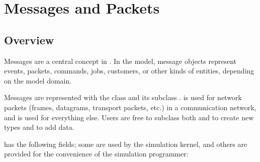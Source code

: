 \chapter{Messages and Packets}
\label{cha:messages}

\section{Overview}
\label{sec:msgs:overview}

Messages are a central concept in {\opp}. In the model, message objects
represent events, packets, commands, jobs, customers, or other kinds of
entities, depending on the model domain.

Messages are represented with the  class and its subclass
.  is used for network packets (frames,
datagrams, transport packets, etc.) in a communication network, and
 is used for everything else. Users are free to subclass
both  and  to create new types and to
add data.

 has the following fields; some are used by
the simulation kernel, and others are provided for the convenience
of the simulation programmer:

